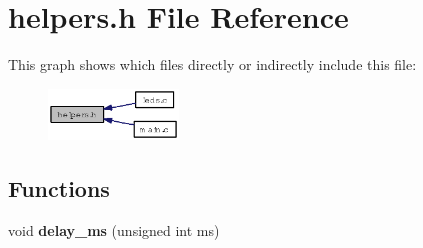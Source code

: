 \section{helpers.h File Reference}
\label{helpers_8h}


This graph shows which files directly or indirectly include this file:\begin{figure}[H]
\begin{center}
\leavevmode
\includegraphics[width=98pt]{helpers_8h__dep__incl}
\end{center}
\end{figure}
\subsection*{Functions}
\begin{CompactItemize}
\item 
void {\bf delay\_\-ms} (unsigned int ms)
\end{CompactItemize}
